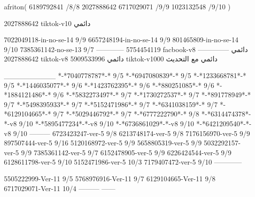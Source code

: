 afriton(
6189792841 /8/8
2027888642
6717029071 /9/9
1023132548 /9/10
)

2027888642 tiktok-v10
دائمي

7022049118-in-no-se-14 9/9
6657248194-in-no-se-14 9/9
801465809-in-no-se-14 9/10
7385361142-no-se-13
9/7
------------
5754454119 facbook-v8
دائمي
--------------
2027888642 tiktok-v8
دائمي
5909533996 tiktok-v1000
دائمي مع التحديث

__________
*-*7040778787*-* 9/5
*-*6947080839*-* 9/5
*-*1233668781*-* 9/5
*-*1446035077*-* 9/6
*-*1423762395*-* 9/6
*-*880251085*-* 9/6
*-*1884121486*-* 9/6
*-*5832273497*-* 9/7
*-*1730272537*-* 9/7
*-*891778949*-* 9/7
*-*5498395933*-* 9/7
*-*5152471986*-* 9/7
*-*6341038159*-* 9/7
*-*6129104665*-* 9/7
*-*5029446792*-* 9/7
*-*6777222790*-* 9/8
*-*6314474378*-*-v8 9/10
*-*5895477234*-*-v8 9/10
*-*6736861029*-*-v8 9/10
*-*6421209540*-*-v8 9/10
---------
6723423247-ver-5 9/8
6213748174-ver-5 9/8
7176156970-ver-5 9/9
897507444-ver-5 9/16
5120168972-ver-5 9/9
5658805319-ver-5 9/9
5032292157-ver-5 9/9
7385361142-ver-5 9/7
6152478905-ver-5 9/9
6226424544-ver-5 9/9
6128611798-ver-5 9/10
5152471986-ver-5 10/3
7179407472-ver-5 9/10
------------

5505222999-Ver-11
9/5
5768976916-Ver-11
9/7
6129104665-Ver-11
9/8
6717029071-Ver-11
10/4
---------
------
